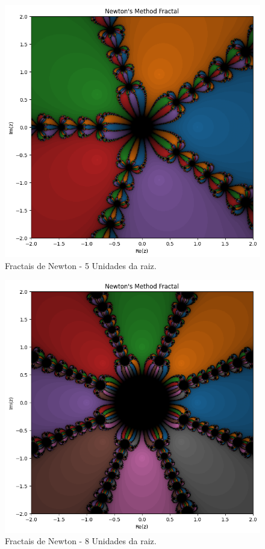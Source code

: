 \begin{figure}[H]
    \centering 
    \includegraphics[width=1\textwidth]{Imagens/nr2d_fractals/unit_roots/unitroot5.png}
    \caption{Fractais de Newton - 5 Unidades da raiz.}
    \label{fig:fractaisnr_unitroots5}
\end{figure}


\begin{figure}[H]
    \centering
    \includegraphics[width=1\textwidth]{Imagens/nr2d_fractals/unit_roots/unitroot8.png}
    \caption{Fractais de Newton - 8 Unidades da raiz.}
    \label{fig:fractaisnr_unitroots8}
\end{figure}


